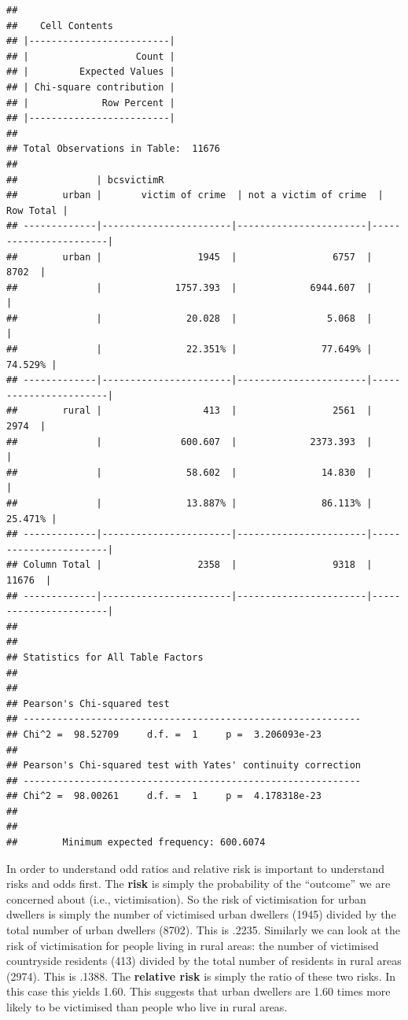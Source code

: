 \documentclass[
]{book}
\begin{document}
\begin{verbatim}
## 
##    Cell Contents
## |-------------------------|
## |                   Count |
## |         Expected Values |
## | Chi-square contribution |
## |             Row Percent |
## |-------------------------|
## 
## Total Observations in Table:  11676 
## 
##              | bcsvictimR 
##        urban |       victim of crime  | not a victim of crime  |             Row Total | 
## -------------|-----------------------|-----------------------|-----------------------|
##        urban |                 1945  |                 6757  |                 8702  | 
##              |             1757.393  |             6944.607  |                       | 
##              |               20.028  |                5.068  |                       | 
##              |               22.351% |               77.649% |               74.529% | 
## -------------|-----------------------|-----------------------|-----------------------|
##        rural |                  413  |                 2561  |                 2974  | 
##              |              600.607  |             2373.393  |                       | 
##              |               58.602  |               14.830  |                       | 
##              |               13.887% |               86.113% |               25.471% | 
## -------------|-----------------------|-----------------------|-----------------------|
## Column Total |                 2358  |                 9318  |                11676  | 
## -------------|-----------------------|-----------------------|-----------------------|
## 
##  
## Statistics for All Table Factors
## 
## 
## Pearson's Chi-squared test 
## ------------------------------------------------------------
## Chi^2 =  98.52709     d.f. =  1     p =  3.206093e-23 
## 
## Pearson's Chi-squared test with Yates' continuity correction 
## ------------------------------------------------------------
## Chi^2 =  98.00261     d.f. =  1     p =  4.178318e-23 
## 
##  
##        Minimum expected frequency: 600.6074
\end{verbatim}

In order to understand odd ratios and relative risk is important to understand risks and odds first. The \textbf{risk} is simply the probability of the ``outcome'' we are concerned about (i.e., victimisation). So the risk of victimisation for urban dwellers is simply the number of victimised urban dwellers (1945) divided by the total number of urban dwellers (8702). This is .2235. Similarly we can look at the risk of victimisation for people living in rural areas: the number of victimised countryside residents (413) divided by the total number of residents in rural areas (2974). This is .1388. The \textbf{relative risk} is simply the ratio of these two risks. In this case this yields 1.60. This suggests that urban dwellers are 1.60 times more likely to be victimised than people who live in rural areas.
\end{document}
